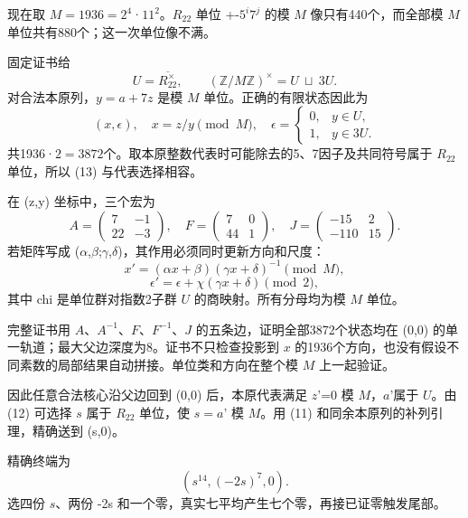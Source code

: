 \documentclass[11pt,a4paper]{article}
\theoremstyle{definition}
\numberwithin{equation}{section}
\begin{document}
{现在取} {\ensuremath{M=1936=2^{4}}·\ensuremath{11^{2}}。\ensuremath{R_{22}}} {单位} {+-\ensuremath{5^{i}7^{j}}} {的模} {\ensuremath{M}} {像只有440个，而全部模} {\ensuremath{M}} {单位共有880个；这一次单位像不满。}

{固定证书给} \[
U=\overline{R_{22}^{\times}},\qquad
(\mathbb Z/M\mathbb Z)^\times=U\ \sqcup\ 3U.
\tag{C31.12}
\] {对合法本原列，\ensuremath{y=a+7z}} {是模} {\ensuremath{M}} {单位。正确的有限状态因此为} \[
\boxed{(x,\epsilon),\quad x=z/y\pmod M,\quad
\epsilon=
\begin{cases}
0,&y\in U,\\
1,&y\in3U.
\end{cases}}
\tag{C31.13}
\] {共1936·\ensuremath{2=3872}个。取本原整数代表时可能除去的5、7因子及共同符号属于} {\ensuremath{R_{22}}} {单位，所以} {(13)} {与代表选择相容。}

{在} {(z,y)} {坐标中，三个宏为} \[
A=\begin{pmatrix}7&-1\\22&-3\end{pmatrix},\quad
F=\begin{pmatrix}7&0\\44&1\end{pmatrix},\quad
J=\begin{pmatrix}-15&2\\-110&15\end{pmatrix}.
\tag{C31.14}
\] {若矩阵写成} {(}\ensuremath{\alpha}{,}\ensuremath{\beta}{;}\ensuremath{\gamma}{,}\ensuremath{\delta}{)，其作用必须同时更新方向和尺度：} \[
x'=(\alpha x+\beta)(\gamma x+\delta)^{-1}\pmod M,
\] \[
\epsilon'=\epsilon+\chi(\gamma x+\delta)\pmod2,
\tag{C31.15}
\] {其中} {chi} {是单位群对指数2子群} {\ensuremath{U}} {的商映射。所有分母均为模} {\ensuremath{M}} {单位。}

{完整证书用} {\ensuremath{A}、\ensuremath{A^{-1}}、\ensuremath{F}、\ensuremath{F^{-1}}、\ensuremath{J}} {的五条边，证明全部3872个状态均在} {(0,0)} {的单一轨道；最大父边深度为8。证书不只检查投影到} {\ensuremath{x}} {的1936个方向，也没有假设不同素数的局部结果自动拼接。单位类和方向在整个模} {\ensuremath{M}} {上一起验证。}

{因此任意合法核心沿父边回到} {(0,0)} {后，本原代表满足} {\ensuremath{z}'=0} {模} {\ensuremath{M}，\ensuremath{a}'属于} {\ensuremath{U}。由} {(12)} {可选择} {\ensuremath{s}} {属于} {\ensuremath{R_{22}}} {单位，使} {\ensuremath{s=a}'} {模} {\ensuremath{M}。用} {(11)} {和同余本原列的补列引理，精确送到} {(s,0)。}

{精确终端为} \[
(s^{14},(-2s)^7,0).
\] {选四份} {\ensuremath{s}、两份} {-2s} {和一个零，真实七平均产生七个零，再接已证零触发尾部。}
\end{document}
